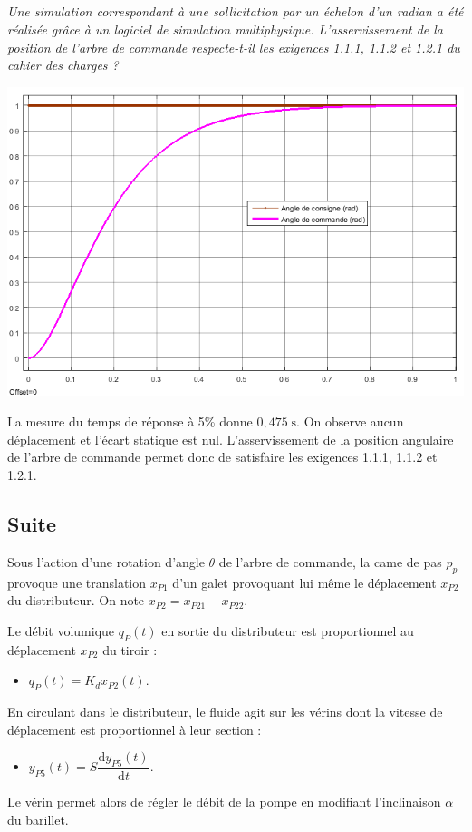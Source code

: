 \documentclass[10pt,fleqn]{article} %
\begin{document}
\begin{multicols}{2}
\subparagraph{}
\textit{Une simulation correspondant à une sollicitation par un échelon d'un radian a été réalisée grâce à un logiciel de simulation multiphysique. L'asservissement de la position de l'arbre de commande respecte-t-il les exigences 1.1.1, 1.1.2 et 1.2.1 du cahier des charges ?}
\begin{center}
\includegraphics[width=.45\textwidth]{images/Simulation2}
\end{center}

\begin{corrige}
La mesure du temps de réponse à 5\% donne $0,475 \; \text{s}$. On observe aucun déplacement et l'écart statique est nul. L'asservissement de la position angulaire de l'arbre de commande permet donc de satisfaire les exigences 1.1.1, 1.1.2 et 1.2.1.
\end{corrige}


\subsection*{Suite}

Sous l'action d'une rotation d'angle $\theta$ de l'arbre de commande, la came de pas $p_p$ provoque une translation $x_{P1}$ d'un galet provoquant lui même le déplacement $x_{P2}$ du distributeur. On note $x_{P2}=x_{P21}-x_{P22}$.

Le débit volumique $q_P(t)$ en sortie du distributeur est proportionnel au déplacement $x_{P2}$ du tiroir : 
\begin{itemize}
\item $q_P(t)=K_d x_{P2}(t)$.
\end{itemize}

En circulant dans le distributeur, le fluide agit sur les vérins dont la vitesse de déplacement est proportionnel à leur section : 
\begin{itemize}
\item $y_{P5}(t)= S \dfrac{\text{d}y_{P5}(t)}{\text{d}t}$.
\end{itemize}


Le vérin permet alors de régler le débit de la pompe en modifiant l'inclinaison $\alpha$ du barillet.



\end{multicols}
\end{document}
